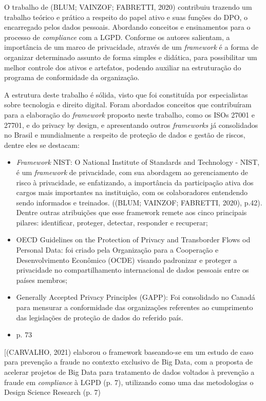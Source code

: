 \documentclass[
	12pt,				%
	openright,			%
	oneside,			%
	a4paper,			%
	english,			%
	french,				%
	spanish,			%
	brazil,				%
	]{abntex2}
\begin{document}
O trabalho de (BLUM; VAINZOF; FABRETTI, 2020) contribuiu trazendo um trabalho teórico e prático a respeito do papel ativo e suas funções do DPO, o encarregado pelos dados pessoais. Abordando conceitos e ensinamentos para o processo de \textit{compliance} com a LGPD. Conforme os autores salientam, a importância de um marco de privacidade, através de um \textit{framework} é a forma de organizar determinado assunto de forma simples e didática, para possibilitar um melhor controle dos ativos e artefatos, podendo auxiliar na estruturação do programa de conformidade da organização.

A estrutura deste trabalho é sólida, visto que foi constituída por especialistas sobre tecnologia e direito digital. Foram abordados conceitos que contribuíram para a elaboração do \textit{framework} proposto neste trabalho, como os ISOs 27001 e 27701, e do privacy by design, e apresentando outros \textit{frameworks} já consolidados no Brasil e mundialmente a respeito de proteção de dados e gestão de riscos, dentre eles se destacam:

\begin{itemize}
\item \textit{Framework} NIST: O National Institute of Standards and Technology - NIST, é um \textit{framework} de privacidade, com sua abordagem ao gerenciamento de risco à privacidade, se enfatizando, a importância da participação ativa dos cargos mais importantes na instituição, com os colaboradores entendendo sendo informados e treinados. ((BLUM; VAINZOF; FABRETTI, 2020), p.42). Dentre outras atribuições que esse framework remete aos cinco principais pilares: identificar, proteger, detectar, responder e recuperar; 
\item OECD Guidelines on the Protection of Privacy and Transborder Flows od Personal Data: foi criado pela Organização para a Cooperação e Desenvolvimento Econômico (OCDE) visando padronizar e proteger a privacidade no compartilhamento internacional de dados pessoais entre os países membros;
\item Generally Accepted Privacy Principles (GAPP): Foi consolidado no Canadá para mensurar a conformidade das organizações referentes ao cumprimento das legislações de proteção de dados do referido país. 
\item p. 73
\end{itemize}

[(CARVALHO, 2021) elaborou o framework baseando-se em um estudo de caso para prevenção a fraude no contexto exclusivo de Big Data, com a proposta de acelerar projetos de Big Data para tratamento de dados voltados à prevenção a fraude em \textit{compliance} à LGPD (p. 7), utilizando como uma das metodologias o Design Science Research (p. 7) 
\end{document}
